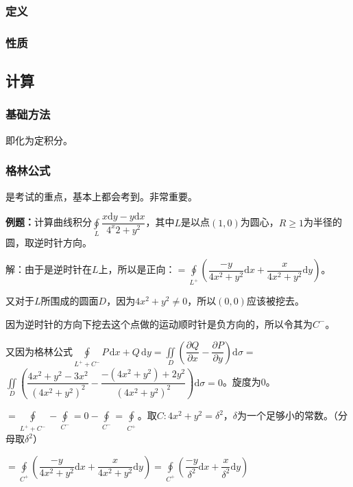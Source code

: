 \documentclass[UTF8, 12pt]{ctexart}
\begin{document}
\subsubsection{定义}

\subsubsection{性质}

\subsection{计算}

\subsubsection{基础方法}

即化为定积分。

\subsubsection{格林公式}

是考试的重点，基本上都会考到。非常重要。

\textbf{例题：}计算曲线积分$\oint\limits_L\dfrac{x\textrm{d}y-y\textrm{d}x}{4^x2+y^2}$，其中$L$是以点$(1,0)$为圆心，$R\geqslant1$为半径的圆，取逆时针方向。

解：由于是逆时针在$L$上，所以是正向：$=\displaystyle{\oint\limits_{L^+}\left(\dfrac{-y}{4x^2+y^2}\textrm{d}x+\dfrac{x}{4x^2+y^2}\textrm{d}y\right)}$。

又对于$L$所围成的圆面$D$，因为$4x^2+y^2\neq0$，所以$(0,0)$应该被挖去。

因为逆时针的方向下挖去这个点做的运动顺时针是负方向的，所以令其为$C^-$。

又因为格林公式$\oint\limits_{L^++C^-}P\,\textrm{d}x+Q\,\textrm{d}y=\displaystyle{\iint\limits_D\left(\dfrac{\partial Q}{\partial x}-\dfrac{\partial P}{\partial y}\right)\textrm{d}\sigma}=$\\$\displaystyle{\iint\limits_D\left(\dfrac{4x^2+y^2-3x^2}{(4x^2+y^2)^2}-\dfrac{-(4x^2+y^2)+2y^2}{(4x^2+y^2)^2}\right)\textrm{d}\sigma}=0$。旋度为0。

$=\oint\limits_{L^++C^-}-\oint\limits_{C^-}=0-\oint\limits_{C^-}=\oint\limits_{C^+}$。取$C:4x^2+y^2=\delta^2$，$\delta$为一个足够小的常数。（分母取$\delta^2$）

$=\displaystyle{\oint\limits_{C^+}\left(\dfrac{-y}{4x^2+y^2}\textrm{d}x+\dfrac{x}{4x^2+y^2}\textrm{d}y\right)}=\displaystyle{\oint\limits_{C^+}\left(\dfrac{-y}{\delta^2}\textrm{d}x+\dfrac{x}{\delta^2}\textrm{d}y\right)}$
\end{document}
